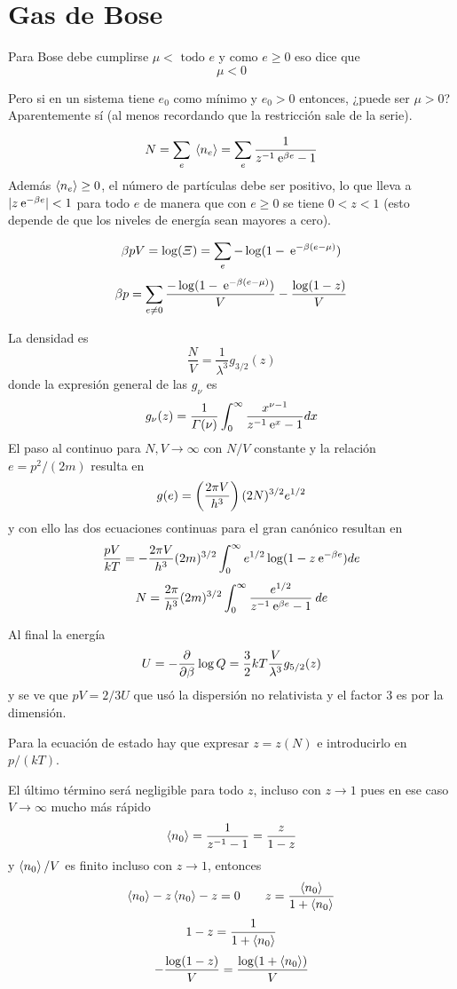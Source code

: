 \documentclass[10pt,oneside]{CBFT_book}
\begin{document}
\chapter{Gas de Bose}

Para Bose debe cumplirse $ \mu < \text{ todo } e $ 
y como $ e \geq 0$ eso dice que 
\[
	\mu < 0
\]

Pero si en un sistema tiene $ e_0 $ como mínimo y $ e_0 > 0 $ entonces, ¿puede ser $ \mu > 0 $?
Aparentemente sí (al menos recordando que la restricción sale de la serie).

\[
	N = \sum_e \:\left\langle n_e \right\rangle = \sum_e \frac{ 1 }{ z^{-1}\:\mathrm{e}^{\beta e} - 1 }
\]
Además $ \braket{n_e} \geq 0 $, el número de partículas debe ser positivo, lo que lleva a 
$| z\:\mathrm{e}^{-\beta e} | < 1 $ para todo $e$ de manera que con $e \geq 0$ se tiene $0<z<1$
(esto depende de que los niveles de energía sean mayores a cero).

\[
	\beta p V = \log (\Xi) = \sum_e - \log ( 1 - \:\mathrm{e}^{-\beta(e-\mu)})
\]
\[
	\beta p = \sum_{e \neq 0} \frac{- \log ( 1 - \:\mathrm{e}^{-\beta(e-\mu)}) }{V} - \frac{\log (1-z)}{V}
\]

La densidad es 
\[
	\frac{N}{V} = \frac{1}{\lambda^3} g_{3/2}(z)
\]
donde la expresión general de las $g_\nu$ es
\[
	g_\nu(z) = \frac{1}{\Gamma(\nu)} \int_0^\infty \frac{ x^{\nu-1} }{z^{-1} \:\mathrm{e}^x - 1 } dx 
\]
El paso al continuo para $N,V \to \infty$ con $N/V$ constante y la relación $e=p^2/(2m)$ resulta en
\[
	g(e) = \left( \frac{ 2 \pi V }{  h^3  } \right) (2N)^{3/2} e^{1/2}
\]
y con ello las dos ecuaciones continuas para el gran canónico resultan en
\[
	\frac{pV}{kT} = -\frac{2\pi V}{h^3} (2m)^{3/2} \int_0^\infty e^{1/2} \log( 1 - z\:\mathrm{e}^{-\beta e}  ) de
\]
\[
	N = \frac{2\pi}{h^3} (2m)^{3/2} \int_0^\infty \frac{ e^{1/2} }{ z^{-1}\:\mathrm{e}^{\beta e} - 1 } \: de
\]

Al final la energía 
\[
	U = - \frac{\partial^{\hspace{-0.05em}} {}}{\partial {\beta}^{\hspace{-0.05em}}} \log Q = \frac{3}{2} k T \frac{V}{\lambda^3} g_{5/2}(z)
\]
y se ve que $pV = 2/3 U$ que usó la dispersión no relativista y el factor 3 es por la dimensión.

Para la ecuación de estado hay que expresar $z = z(N)$ e introducirlo en $p/(kT)$.

El último término será negligible para todo $z$, incluso con $z\to 1$ pues en ese caso $V \to \infty$ mucho
más rápido
\[
	\braket{n_0} = \frac{1}{z^{-1}-1} = \frac{z}{1-z}
\]
y $ \braket{n_0} / V $ es finito incluso con $z\to 1$, entonces
\[
	\braket{n_0} - z \braket{n_0} - z = 0 \qquad z = \frac{\braket{n_0}}{1+\braket{n_0}}
\]
\[
	1-z = \frac{1}{1+\braket{n_0}}
\]
\[
	- \frac{\log (1-z)}{V} = \frac{\log (1+\braket{n_0})}{V}
\]
 
\end{document}

